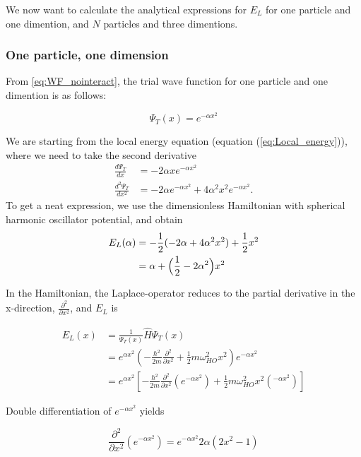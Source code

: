 \documentclass[norsk,a4paper,12pt]{article}
\begin{document}
We now want to calculate the analytical expressions for $E_L$ for one particle and one dimention, and $N$ particles and three dimentions.

\subsubsection{One particle, one dimension}

From \ref{eq:WF_nointeract}, the trial wave function for one particle and one dimention is as follows:

\begin{equation}
	\label{eq:WF_1dim_1N}
	\Psi_T(x) = e^{-\alpha x^2} 
\end{equation}

We are starting from the local energy equation (equation (\ref{eq:Local_energy})), where we need to take the second derivative
\begin{align}
\frac{d\Psi_T}{dx}&=-2\alpha xe^{-\alpha x^2}\\
\frac{d^2\Psi_T}{dx^2}&=-2\alpha e^{-\alpha x^2}+4\alpha^2x^2e^{-\alpha x^2}.
\end{align}
To get a neat expression, we use the dimensionless Hamiltonian with spherical harmonic oscillator potential, and obtain
\begin{align}
E_L(\alpha)&=-\frac{1}{2}(-2\alpha + 4\alpha^2x^2)+\frac{1}{2}x^2\notag\\
&=\alpha+\Big(\frac{1}{2}-2\alpha^2\Big)x^2
\end{align}

\iffalse
In the Hamiltonian, the Laplace-operator reduces to the partial derivative in the x-direction, $\frac{\partial^2 }{\partial x^2}$, and $E_L$ is 

\begin{equation}
\begin{aligned}
E_L(x) &=  \frac{1}{\Psi_T(x)}\hat{H}\Psi_T(x) \\ 
			 & =  e^{\alpha x^2} (-\frac{\hbar^2}{2m}\frac{\partial^2 }{\partial x^2} + \frac{1}{2} m \omega_{HO}^2 x^2) e^{-\alpha x^2}  \\
			 & = e^{\alpha x^2} [-\frac{\hbar^2}{2m}\frac{\partial^2 }{\partial x^2} (e^{-\alpha x^2}) + \frac{1}{2} m \omega_{HO}^2 x^2 (^{-\alpha x^2})]
\end{aligned}
\end{equation}

Double differentiation of $ e^{-\alpha x^2}$ yields

\begin{equation}
\frac{\partial^2}{\partial x^2} (e^{-\alpha x^2}) = e^{-\alpha x^2} 2 \alpha (2x^2 -1)
\end{equation}
\end{document}
